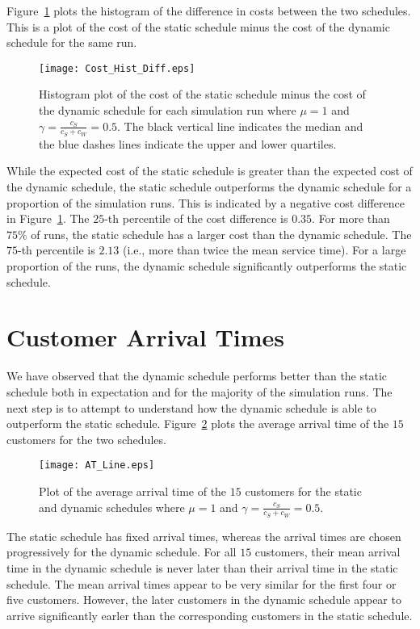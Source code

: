 Figure~\ref{fig:Diff_Cost} plots the histogram of the difference in costs between the two schedules. This is a plot of the cost of the static schedule minus the cost of the dynamic schedule for the same run.
\begin{figure}[htb]
	\centering
	\texttt{[image: Cost\_Hist\_Diff.eps]}
	\caption{Histogram plot of the cost of the static schedule minus the cost of the dynamic schedule for each simulation run where $\mu = 1$ and $\gamma = \frac{c_{S}}{c_{S} + c_{W}} = 0.5$. The black vertical line indicates the median and the blue dashes lines indicate the upper and lower quartiles.}
	\label{fig:Diff_Cost}
\end{figure}

While the expected cost of the static schedule is greater than the expected cost of the dynamic schedule, the static schedule outperforms the dynamic schedule for a proportion of the simulation runs. This is indicated by a negative cost difference in Figure~\ref{fig:Diff_Cost}. The $25$-th percentile of the cost difference is $0.35$. For more than $75 \%$ of runs, the static schedule has a larger cost than the dynamic schedule. The $75$-th percentile is $2.13$ (i.e., more than twice the mean service time). For a large proportion of the runs, the dynamic schedule significantly outperforms the static schedule.

\section{Customer Arrival Times}
We have observed that the dynamic schedule performs better than the static schedule both in expectation and for the majority of the simulation runs. The next step is to attempt to understand how the dynamic schedule is able to outperform the static schedule. Figure~\ref{fig:Avg_Arrival} plots the average arrival time of the $15$ customers for the two schedules.
\begin{figure}[htb]
	\centering
	\texttt{[image: AT\_Line.eps]}
	\caption{Plot of the average arrival time of the $15$ customers for the static and dynamic schedules where $\mu = 1$ and $\gamma = \frac{c_{S}}{c_{S} + c_{W}} = 0.5$.}
	\label{fig:Avg_Arrival}
\end{figure}

The static schedule has fixed arrival times, whereas the arrival times are chosen progressively for the dynamic schedule. For all $15$ customers, their mean arrival time in the dynamic schedule is never later than their arrival time in the static schedule. The mean arrival times appear to be very similar for the first four or five customers. However, the later customers in the dynamic schedule appear to arrive significantly earler than the corresponding customers in the static schedule.

